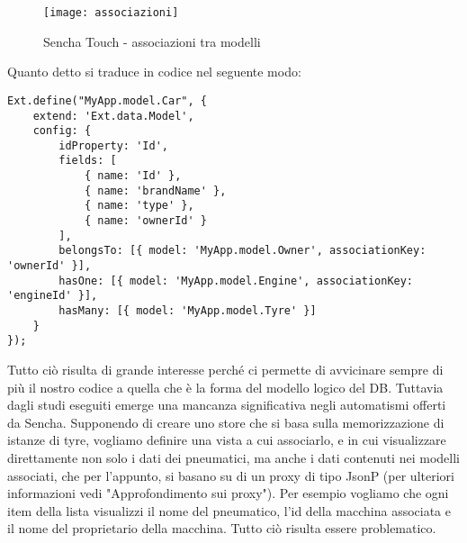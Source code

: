 \documentclass[10pt,a4paper,onecolumn]{article}
\begin{document}
\begin{figure}[h]
	\centering
	\texttt{[image: associazioni]}
	\caption{Sencha Touch - associazioni tra modelli}						
	\label{fig:associazioni}
\end{figure}

Quanto detto si traduce in codice nel seguente modo:
\begin{lstlisting}
Ext.define("MyApp.model.Car", {
    extend: 'Ext.data.Model',
    config: {
        idProperty: 'Id',
        fields: [
            { name: 'Id' },
            { name: 'brandName' },
            { name: 'type' },
            { name: 'ownerId' }
        ],
        belongsTo: [{ model: 'MyApp.model.Owner', associationKey: 'ownerId' }],
        hasOne: [{ model: 'MyApp.model.Engine', associationKey: 'engineId' }],
        hasMany: [{ model: 'MyApp.model.Tyre' }]
    }
});
\end{lstlisting}

Tutto ciò risulta di grande interesse perché ci permette di avvicinare sempre di più il nostro codice a quella che è la forma del modello logico del DB. Tuttavia dagli studi eseguiti emerge una mancanza significativa negli automatismi offerti da Sencha. Supponendo di creare uno store che si basa sulla memorizzazione di istanze di tyre, vogliamo definire una vista a cui associarlo, e in cui visualizzare direttamente non solo i dati dei pneumatici, ma anche i dati contenuti nei modelli associati, che per l'appunto, si basano su di un proxy di tipo JsonP (per ulteriori informazioni vedi "Approfondimento sui proxy"). Per esempio vogliamo che ogni item della lista visualizzi il nome del pneumatico, l'id della macchina associata e il nome del proprietario della macchina. Tutto ciò risulta essere problematico.
\end{document}
